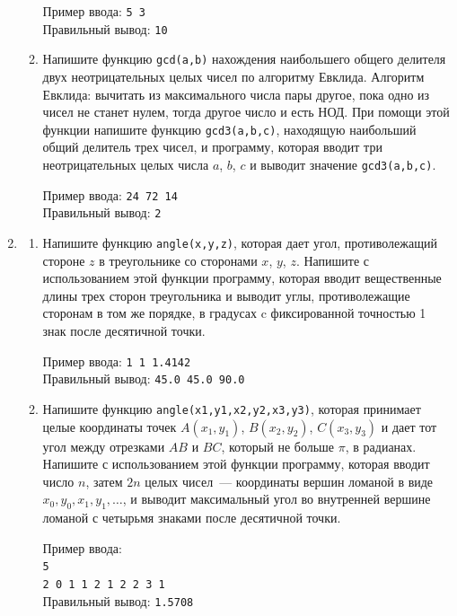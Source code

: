 \documentclass{article}
\newcommand{\textex}[1]{\texttt{\color{ForestGreen}#1}}
\begin{document}
\begin{enumerate}[label={}, leftmargin=0pt, itemindent=0pt]
\begin{enumerate}[label=\arabic{enumi}.\arabic*.]
\noindent Пример ввода: \textex{5 3}\\
Правильный вывод: \textex{10}

\item
Напишите функцию \texttt{gcd(a,b)} нахождения наибольшего общего делителя двух неотрицательных целых чисел по алгоритму Евклида. Алгоритм Евклида: вычитать из максимального числа пары другое, пока одно из чисел не станет нулем, тогда другое число и есть НОД. При помощи этой функции напишите функцию \texttt{gcd3(a,b,c)}, находящую наибольший общий делитель трех чисел, и программу, которая вводит три неотрицательных целых числа $a$, $b$, $c$ и выводит значение \texttt{gcd3(a,b,c)}.

\noindent Пример ввода: \textex{24 72 14}\\
Правильный вывод: \textex{2}
\end{enumerate}

\medskip\hrulefill\medskip
\item 

\begin{enumerate}[label=\arabic{enumi}.\arabic*.] %
\item
Напишите функцию \texttt{angle(x,y,z)}, которая дает угол, противолежащий стороне $z$ в треугольнике со сторонами $x$, $y$, $z$. Напишите с использованием этой функции программу, которая вводит вещественные длины трех сторон треугольника и выводит углы, противолежащие сторонам в том же порядке, в градусах c фиксированной точностью 1 знак после десятичной точки.

\noindent
Пример ввода: \textex{1 1 1.4142}\\
Правильный вывод: \textex{45.0 45.0 90.0}

\item
Напишите функцию \texttt{angle(x1,y1,x2,y2,x3,y3)}, которая принимает целые координаты точек $A(x_1, y_1)$, $B(x_2, y_2)$, $C(x_3, y_3)$ и дает тот угол между отрезками $AB$ и $BC$, который не больше $\pi$, в радианах. Напишите с использованием этой функции программу, которая вводит число $n$, затем $2n$ целых чисел~--- координаты вершин ломаной в виде $x_0, y_0, x_1, y_1, \ldots$, и выводит максимальный угол во внутренней вершине ломаной с четырьмя знаками после десятичной точки.

\noindent
Пример ввода: \\
\textex{5\\
2 0 1 1 2 1 2 2 3 1}\\
Правильный вывод: \textex{1.5708}


\end{enumerate}
\end{enumerate}
\end{document}
